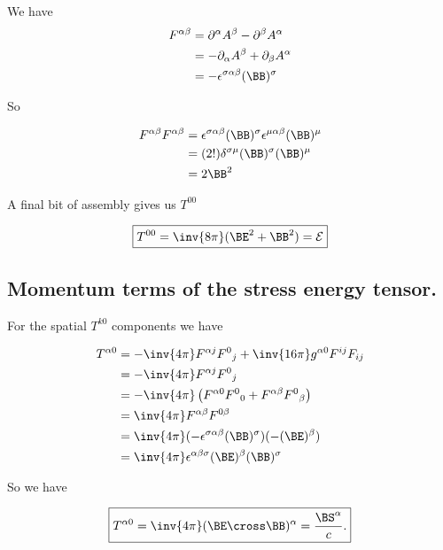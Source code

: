 We have 
\begin{align*}
F^{\alpha \beta} 
&= \partial^\alpha A^\beta - \partial^\beta A^\alpha \\
&= -\partial_\alpha A^\beta + \partial_\beta A^\alpha \\
&= -\epsilon^{\sigma \alpha \beta} (\BB)^\sigma
\end{align*}

So

\begin{align*}
F^{\alpha \beta} F^{\alpha \beta} 
&= 
\epsilon^{\sigma \alpha \beta} (\BB)^\sigma
\epsilon^{\mu \alpha \beta} (\BB)^\mu \\
&= (2!) \delta^{\sigma \mu} 
(\BB)^\sigma
(\BB)^\mu \\
&= 2 \BB^2
\end{align*}

A final bit of assembly gives us $T^{0 0}$

\begin{equation}\label{eqn:relativisticElectrodynamicsPS6P1:120}
\boxed{
T^{ 0 0 } = \inv{8 \pi} ( \BE^2 + \BB^2 ) = \mathcal{E}
}
\end{equation}

\subsection{Momentum terms of the stress energy tensor.}

For the spatial $T^{k 0}$ components we have

\begin{align*}
T^{\alpha 0} 
&= 
-\inv{4 \pi} F^{\alpha j} {F^0}_j + \inv{16 \pi} g^{\alpha 0} F^{i j} F_{i j} \\
&= 
-\inv{4 \pi} F^{\alpha j} {F^0}_j \\
&= 
-\inv{4 \pi} 
\left( 
F^{\alpha 0} {F^0}_0 
+F^{\alpha \beta} {F^0}_\beta 
\right) \\
&= 
\inv{4 \pi} F^{\alpha \beta} F^{0 \beta} \\
&= 
\inv{4 \pi} (-\epsilon^{\sigma \alpha \beta} (\BB)^\sigma) (-(\BE)^\beta) \\
&= 
\inv{4 \pi} \epsilon^{\alpha \beta \sigma} 
(\BE)^\beta 
(\BB)^\sigma
\\
\end{align*}

So we have

\begin{equation}\label{eqn:relativisticElectrodynamicsPS6P1:140}
\boxed{
T^{\alpha 0} = \inv{4 \pi} (\BE \cross \BB)^\alpha = \frac{\BS^\alpha}{c}.
}
\end{equation}


